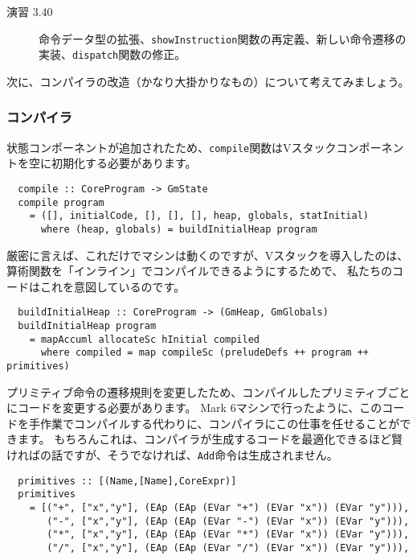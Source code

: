\documentclass{jarticle}
\begin{document}
\begin{description}
	\item[演習 3.40] 命令データ型の拡張、\texttt{showInstruction}関数の再定義、新しい命令遷移の実装、\texttt{dispatch}関数の修正。
\end{description}

次に、コンパイラの改造（かなり大掛かりなもの）について考えてみましょう。

\subsubsection{コンパイラ}

状態コンポーネントが追加されたため、\texttt{compile}関数はVスタックコンポーネントを空に初期化する必要があります。

\begin{verbatim}
  compile :: CoreProgram -> GmState
  compile program
    = ([], initialCode, [], [], [], heap, globals, statInitial)
      where (heap, globals) = buildInitialHeap program
\end{verbatim}

厳密に言えば、これだけでマシンは動くのですが、Vスタックを導入したのは、
算術関数を「インライン」でコンパイルできるようにするためで、
私たちのコードはこれを意図しているのです。

\begin{verbatim}
  buildInitialHeap :: CoreProgram -> (GmHeap, GmGlobals)
  buildInitialHeap program
    = mapAccuml allocateSc hInitial compiled
      where compiled = map compileSc (preludeDefs ++ program ++ primitives)
\end{verbatim}

プリミティブ命令の遷移規則を変更したため、コンパイルしたプリミティブごとにコードを変更する必要があります。
Mark 6マシンで行ったように、このコードを手作業でコンパイルする代わりに、コンパイラにこの仕事を任せることができます。
もちろんこれは、コンパイラが生成するコードを最適化できるほど賢ければの話ですが、そうでなければ、\texttt{Add}命令は生成されません。

\begin{verbatim}
  primitives :: [(Name,[Name],CoreExpr)]
  primitives
    = [("+", ["x","y"], (EAp (EAp (EVar "+") (EVar "x")) (EVar "y"))),
       ("-", ["x","y"], (EAp (EAp (EVar "-") (EVar "x")) (EVar "y"))),
       ("*", ["x","y"], (EAp (EAp (EVar "*") (EVar "x")) (EVar "y"))),
       ("/", ["x","y"], (EAp (EAp (EVar "/") (EVar "x")) (EVar "y"))),
\end{verbatim}
\end{document}
